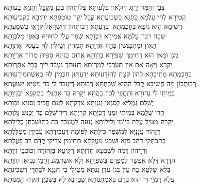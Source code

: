\documentclass[twoside, openany, parskip=half, 11pt]{book}
\begin{document}
\begin{footnotesize}
\kahal
צְבִי וְחַמֵּד וְרַגֵּג דְּיִלְאוּן בְּלָעוּתָא צְלוֹתְהוֹן בְּכֵן מְקַבֵּל וְהַנְיָא בָעוּתָא׃\\
\shatz
קְטִירָא לְחֵי עָלְמָא בְּתָגָא בִּשְׁבוּעֲתָא קֳבֵל יְקַר טוֹטַפְתָּא יְתִיבָא בִקְבִיעוּתָא׃\\
\kahal
רְשִׁימָא הִיא גוּפָא בְּחׇכְמְתָא וּבְדַעְתָּא רְבוּתְהוֹן דְּיִשְׂרָאֵל קְרָאֵי בִשְׁמַעְתָּא׃\\
\shatz
שְׁבַח רִבּוֹן עָלְמָא אֲמִירָא דַכְוָתָא שְׁפַר עֲלַי לְחַוּוֹיֵהּ בְּאַפֵּי מַלְכְּוָתָא׃\\
\kahal
תָּאִין וּמִתְכַּנְּשִׁין כְּחֵזוּ אִדְוָתָא תְּמֵהִין וְשָׁיְלִין לֵהּ בְּעֵסֶק אַתְוָתָא׃\\
\shatz
מְנָן וּמָאן הוּא רְחִימָךְ שַׁפִּירָא בְרֵוָתָא אֲרוּם בְּגִינֵהּ סָפִית מְדוֹר אַרְיָוָתָא׃\\
\kahal
יְקָרָא וְיָאָה אַתְּ אִין תְּעֹרְבִי לְמַרְוָתָא רְעוּתֵךְ נַעְבֵּד לִיךְ בְּכׇל אַתְרְוָתָא׃\\
\shatz
בְּחׇכְמְתָא מְתִיבָתָא לְהוֹן קְצָת לְהוֹדָעוּתָא יְדַעְתּוּן חַכְּמִין לֵהּ בְּאִשְׁתְּמוֹדָעוּתָא׃\\
\kahal
רְבוּתְכוֹן מָה חֲשִׁיבָא קֳבֵל הַהִיא שְׁבַחְתָּא רְבוּתָא דְּיַעְבֵּד לִי כַּד מַטְיָא יְשׁוּעֲתָא׃\\
\shatz
בְּמֵיתֵי לִי נְהוֹרָא וְתַחֲפֵי לְכוֹן בַּהֲתָא יְקָרֵהּ כַּד אִתְגְּלִי בְּתֻקְפָא וּבְגֵיוָתָא׃\\
\kahal
יְשַׁלֵּם גְּמֻלַּיָּא לְסַנְאֵי וְנַגְוָתָא צִדְקָתָא לְעַם חֲבִיב וְסַגִּיא זַכְוָתָא׃\\
\shatz
חֲדוּ שְׁלֵמָא בְּמֵיתֵי וּמָנֵי דַכְיָתָא קִרְיְתָא דִירוּשְׁלֵם כַּד יְכַנֵּשׁ גַּלְוָתָא׃\\
\kahal
יְקָרֵהּ מַטִּיל עֲלַהּ בְּיוֹמֵי וְלֵילְוָתָא גְּנוּנֵהּ לְמֶעְבַּד בַּהּ בְּתוּשְׁבְּחָן כְּלִילָתָא׃\\
\shatz
דְּזֵהוֹר עֲנָנַיָּא לְמִשְׁפַּר כִּילָתָא לְפוּמֵהּ דַּעֲבִידְתָּא עֲבִידָן מְטַלַּלְתָּא׃\\
\kahal
בְּתַכְתְּקֵי דְּהַב פִּזָּא וּשְׁבַע מַעֲלָתָא תְּחִימִין צַדִּיקֵי קֳדָם רַב פׇּעֳלָתָא׃\\
\shatz
וְרֵוֵיהוֹן דָּמֵה לְשַׁבְעָא חֶדְוָתָא רְקִיעָא בְּזֵהוֹרֵהּ וְכוֹכְבֵי זִיוָתָא׃\\
\kahal
הֲדָרָא דְּלָא אֶפְשַׁר לְמִפְרַט בְּשִׂפְוָתָא וְלָא אִשְׁתְּמַע וְחָמֵי נְבִיאָן חֶזְוָתָא׃\\
\shatz
בְּלָא שָׁלְטָא בֵהּ עֵין בְּגוֹ עֵדֶן גִּנְתָא מְטַיְלֵי בֵי חִנְגָּא לְבַהֲדֵי דִשְׁכִינְתָּא׃\\
\kahal
עֲלֵהּ רָמְזֵי דֵּן הוּא בְּרַם בְּאֶמְתָּנוּתָא שַׂבַּרְנָא לֵהּ בְּשִׁבְיָן תְּקוֹף הֵמְנוּתָא׃\\

\end{footnotesize}
\end{document}
